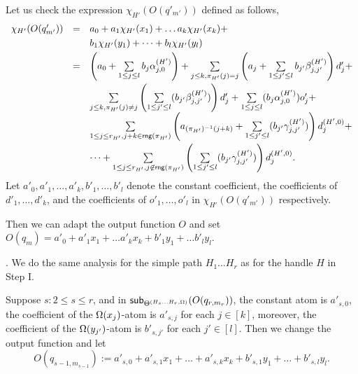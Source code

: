 {Let us check the expression $\chi_{H'}(O(q'_{m'}))$ defined as follows,
\[
\begin{array}{l c l}
\smallskip
\chi_{H'}(O(q'_{m'})) & = & a_0 + a_1 \chi_{H'}(x_1) + \dots a_k \chi_{H'}(x_k) + \\
\smallskip
& & b_1 \chi_{H'}(y_1) + \dots + b_l \chi_{H'}(y_l) \\
\smallskip
&  = &  \left(a_0+\sum \limits_{1 \le j \le l} b_j \alpha^{(H')}_{j,0} \right) + \sum \limits_{j \le k, \pi_{H'}(j)=j} \left(a_j + \sum \limits_{1 \le j' \le l} b_{j'} \beta^{(H')}_{j,j'} \right) d'_j  + \\
%
& & \sum \limits_{j \le k, \pi_{H'}(j) \neq j} \left(\sum \limits_{1 \le j' \le l} (b_{j'} \beta^{(H')}_{j,j'})\right) d'_j + \sum \limits_{1\le j \le l} (b_{j} \alpha^{(H')}_{j,0}) o'_{j} + \\
\smallskip
%
& & \sum \limits_{1 \le j \le r_{H'}, j+k \in \rng(\pi_{H'})} \left(a_{(\pi_{H'})^{-1}(j+k)}+\sum \limits_{1 \le j' \le l} (b_{j'} \gamma^{(H')}_{j,j'})\right) d^{(H',0)}_j +\\ & & \dots  + \sum \limits_{1 \le j \le r_{H'}, j \not \in \rng(\pi_{H'})} \left(\sum \limits_{1 \le j' \le l} (b_{j'} \gamma^{(H')}_{j,j'})\right) d^{(H',0)}_j.
\end{array}
\] 
Let $a'_0,a'_1,\dots,a'_k,b'_1,\dots,b'_l$ denote the constant coefficient, the coefficients of $d'_1,\dots,d'_k$, and the coefficients of $o'_1,\dots,o'_l$ in $\chi_{H'}(O(q'_{m'}))$ respectively. 

Then we can adapt the output function $O$ and set $O(q_m) = a'_0 + a'_1 x_1 + \dots a'_k x_k + b'_1 y_1 + \dots b'_l y_l$.
}


\smallskip

. We do the same analysis for the simple path $H_1\dots H_r$ as for the handle $H$ in Step I.

\smallskip

Suppose $s: 2 \le s \le r$, and  in $\sub{O(q_{r,m_r})}{\sumf^{(H_s\dots H_{r}, \initval)}}$, the constant atom is $a'_{s,0}$, the coefficient of the $\initval(x_j)$-atom is $a'_{s, j}$ for each $j \in [k]$, moreover, the coefficient of the $\initval(y_{j'})$-atom is $b'_{s, j'}$ for each $j' \in [l]$. Then we change the output function and let
\[O(q_{s-1, m_{s-1}}):=a'_{s, 0}+a'_{s, 1} x_1 + \dots + a'_{s, k} x_k + b'_{s,1} y_1 + \dots + b'_{s, l} y_l.\]

